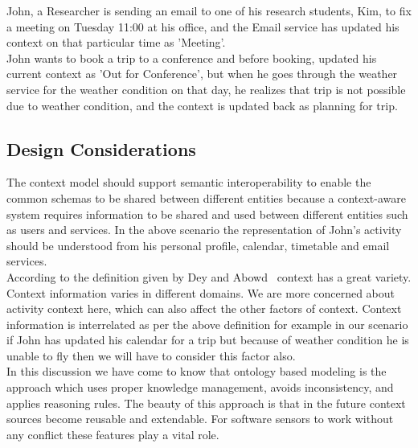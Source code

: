 \documentclass[copyright,creativecommons,noderivs,noncommercial]{eptcs}
\begin{document}
\noindent John, a Researcher is sending an email to one of his research students, Kim, to fix a meeting on Tuesday 11:00 at his office, and the Email service has updated his context on that particular time as 'Meeting'.\\

\noindent John wants to book a trip to a conference and before booking, updated his current context as 'Out for Conference', but when he goes through the weather service for the weather condition on that day, he realizes that trip is not possible due to weather condition, and the context is updated back as planning for trip.
\subsection{Design Considerations}
The context model should support semantic interoperability to enable the common schemas to be shared between different entities because a context-aware system requires information to be shared and used between different entities such as users and services. In the above scenario the representation of John's activity should be understood from his personal profile, calendar, timetable and email services.\\
According to the definition given by Dey and Abowd~\cite{k9} context has a great variety. Context information varies in different domains. We are more concerned about activity context here, which can also affect the other factors of context. Context information is interrelated as per the above definition for example in our scenario if John has updated his calendar for a trip but because of weather condition he is unable to fly then we will have to consider this factor also.\\
In this discussion we have come to know that ontology based modeling is the approach which uses proper knowledge management, avoids inconsistency, and applies reasoning rules. The beauty of this approach is that in the future context sources become reusable and extendable. For software sensors to work without any conflict these features play a vital role.
\end{document}
